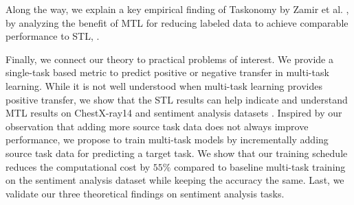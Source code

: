 Along the way, we explain a key empirical finding of Taskonomy by Zamir et al. \cite{ZSSGM18}, by analyzing the benefit of MTL for reducing labeled data to achieve comparable performance to STL, .

Finally, we connect our theory to practical problems of interest.
We provide a single-task based metric to predict positive or negative transfer in multi-task learning.
While it is not well understood when multi-task learning provides positive transfer, we show that the STL results can help indicate and understand MTL results on ChestX-ray14 \cite{chexnet17} and sentiment analysis datasets \cite{LZWDA18}.
Inspired by our observation that adding more source task data does not always improve performance, we propose to train multi-task models by incrementally adding source task data for predicting a target task.
We show that our training schedule reduces the computational cost by $55\%$ compared to baseline multi-task training on the sentiment analysis dataset while keeping the accuracy the same.
Last, we validate our three theoretical findings on sentiment analysis tasks.
